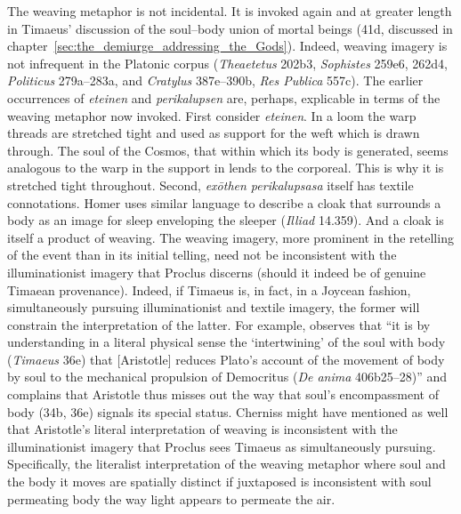 The weaving metaphor is not incidental. It is invoked again and at greater length in Timaeus' discussion of the soul--body union of mortal beings (41d, discussed in chapter~\ref{sec:the_demiurge_addressing_the_Gods}). Indeed, weaving imagery is not infrequent in the Platonic corpus (\emph{Theaetetus} 202b3, \emph{Sophistes} 259e6, 262d4, \emph{Politicus} 279a--283a, and \emph{Cratylus} 387e--390b, \emph{Res Publica} 557c). The earlier occurrences of \emph{eteinen} and \emph{perikalupsen} are, perhaps, explicable in terms of the weaving metaphor now invoked. First consider \emph{eteinen}. In a loom the warp threads are stretched tight and used as support for the weft which is drawn through. The soul of the Cosmos, that within which its body is generated, seems analogous to the warp in the support in lends to the corporeal. This is why it is stretched tight throughout. Second, \emph{exōthen perikalupsasa} itself has textile connotations. Homer uses similar language to describe a cloak that surrounds a body as an image for sleep enveloping the sleeper (\emph{Illiad} 14.359). And a cloak is itself a product of weaving. The weaving imagery, more prominent in the retelling of the event than in its initial telling, need not be inconsistent with the illuminationist imagery that Proclus discerns (should it indeed be of genuine Timaean provenance). Indeed, if Timaeus is, in fact, in a Joycean fashion, simultaneously pursuing illuminationist and textile imagery, the former will constrain the interpretation of the latter. For example, \citet[406]{Cherniss:1944aa} observes that ``it is by understanding in a literal physical sense the `intertwining' of the soul with body (\emph{Timaeus} 36e) that [Aristotle] reduces Plato's account of the movement of body by soul to the mechanical propulsion of Democritus (\emph{De anima} 406b25--28)'' and complains that Aristotle thus misses out the way that soul's encompassment of body (34b, 36e) signals its special status. Cherniss might have mentioned as well that Aristotle's literal interpretation of weaving is inconsistent with the illuminationist imagery that Proclus sees Timaeus as simultaneously pursuing. Specifically, the literalist interpretation of the weaving metaphor where soul and the body it moves are spatially distinct if juxtaposed is inconsistent with soul permeating body the way light appears to permeate the air.

